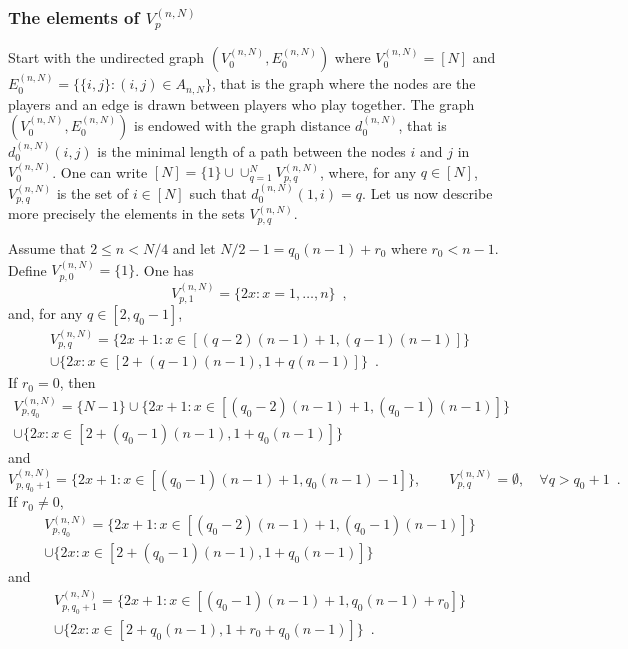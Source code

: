 \subsubsection{The elements of $V_p^{(n,N)}$}
Start with the undirected graph $(V^{(n,N)}_0,E^{(n,N)}_0)$ where $V^{(n,N)}_0=[N]$ and $E^{(n,N)}_0=\{\{i,j\} : (i,j)\in A_{n,N}\}$, that is the graph where the nodes are the players and an edge is drawn between players who play together. The graph $(V^{(n,N)}_0,E^{(n,N)}_0)$ is endowed with the graph distance $d^{(n,N)}_0$, that is $d^{(n,N)}_0(i,j)$ is the minimal length of a path between the nodes $i$ and $j$ in $V^{(n,N)}_0$. One can write $[N]=\{1\}\cup\cup_{q=1}^{N}V^{(n,N)}_{p,q}$, where, for any $q\in[N]$, $V^{(n,N)}_{p,q}$ is the set of $i\in[N]$ such that $d^{(n,N)}_0(1,i)=q$. Let us now describe more precisely the elements in the sets $V_{p,q}^{(n,N)}$. 
\begin{lemma}\label{lem:ElementsAtDistanceq} Assume that $2\le n<N/4$ and let $N/2-1= q_0(n-1)+r_0$ where $r_0<n-1$. Define $V_{p,0}^{(n,N)}=\{1\}$. One has
\begin{equation}\label{def:V1}
V_{p,1}^{(n,N)}=\{2x : x=1,\ldots,n\}\enspace, 
\end{equation}
and, for any $q\in[2,q_0-1]$, 
\begin{multline}\label{def:Vq}
V_{p,q}^{(n,N)}=\{2x+1 : x\in[(q-2)(n-1)+1,(q-1)(n-1)]\}\\
\cup\{2x : x\in[2+(q-1)(n-1),1+q(n-1)]\}\enspace.
\end{multline}
If $r_0=0$, then
\begin{multline}\label{def:Vq0}
V_{p,q_0}^{(n,N)}=\{N-1\}\cup\{2x+1 : x\in[(q_0-2)(n-1)+1,(q_0-1)(n-1)]\}\\
\cup\{2x : x\in[2+(q_0-1)(n-1),1+q_0(n-1)]\}
\end{multline}
and
\begin{equation}\label{def:Vq01}
V_{p,q_0+1}^{(n,N)}=\{2x+1 : x\in[(q_0-1)(n-1)+1,q_0(n-1)-1]\},\qquad V_{p,q}^{(n,N)}=\emptyset,\quad\forall q>q_0+1\enspace.
\end{equation}
If $r_0\ne 0$, 
\begin{multline}\label{def:Vq0'}
V_{p,q_0}^{(n,N)}=\{2x+1 : x\in[(q_0-2)(n-1)+1,(q_0-1)(n-1)]\}\\
\cup\{2x : x\in[2+(q_0-1)(n-1),1+q_0(n-1)]\}
\end{multline}
and
\begin{multline}\label{def:Vq01'}
V_{p,q_0+1}^{(n,N)}=\{2x+1 : x\in[(q_0-1)(n-1)+1,q_0(n-1)+r_0]\}\\
\cup\{2x : x\in[2+q_0(n-1),1+r_0+q_0(n-1)]\}\enspace.
\end{multline}
\end{lemma}
